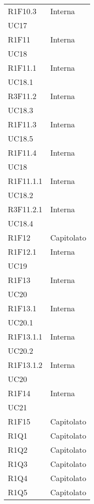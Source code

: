 \begin{longtable}{|C{6.5cm}|C{6.5cm}|}
	R1F10.3 &  \centering Interna \\ UC17 \tabularnewline

	R1F11 & \centering Interna \\ UC18 \tabularnewline

	R1F11.1 &  \centering Interna \\ UC18.1 \tabularnewline

	R3F11.2 & \centering Interna \\ UC18.3 \tabularnewline

	R1F11.3 & \centering Interna \\ UC18.5 \tabularnewline

	R1F11.4 & \centering Interna \\ UC18 \tabularnewline

	R1F11.1.1 & \centering Interna \\ UC18.2 \tabularnewline

	R3F11.2.1 & \centering Interna \\ UC18.4 \tabularnewline

	R1F12 &   Capitolato \\

	R1F12.1 & \centering Interna \\ UC19 \tabularnewline

	R1F13 & \centering Interna \\ UC20 \tabularnewline

	R1F13.1 & \centering Interna \\ UC20.1 \tabularnewline

	R1F13.1.1 & \centering Interna \\ UC20.2 \tabularnewline

	R1F13.1.2 & \centering Interna \\ UC20 \tabularnewline

	R1F14 & \centering Interna \\ UC21 \tabularnewline

	R1F15 & Capitolato \\

	R1Q1 & Capitolato \\

	R1Q2 & Capitolato \\

	R1Q3 & Capitolato \\

	R1Q4 & Capitolato \\

	R1Q5 & Capitolato \\


\end{longtable}
